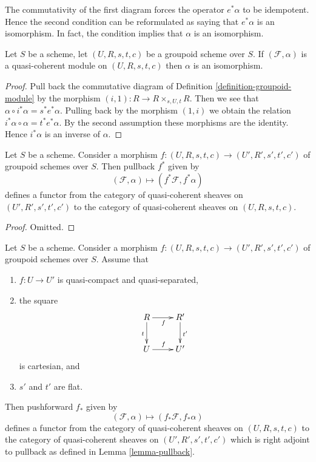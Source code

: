 \noindent
The commutativity of the first diagram forces the operator $e^*\alpha$
to be idempotent. Hence the second condition can be reformulated as saying
that $e^*\alpha$ is an isomorphism. In fact, the condition implies that
$\alpha$ is an isomorphism.

\begin{lemma}
\label{lemma-isomorphism}
Let $S$ be a scheme, let $(U, R, s, t, c)$ be a groupoid scheme over $S$.
If $(\mathcal{F}, \alpha)$ is a quasi-coherent module on $(U, R, s, t, c)$
then $\alpha$ is an isomorphism.
\end{lemma}

\begin{proof}
Pull back the commutative diagram of
Definition \ref{definition-groupoid-module}
by the morphism $(i, 1) : R \to R \times_{s, U, t} R$.
Then we see that $\alpha \circ i^*\alpha = s^*e^*\alpha$.
Pulling back by the morphism $(1, i)$ we obtain the relation
$i^*\alpha \circ \alpha = t^*e^*\alpha$. By the second assumption 
these morphisms are the identity. Hence $i^*\alpha$ is an inverse of
$\alpha$.
\end{proof}

\begin{lemma}
\label{lemma-pullback}
Let $S$ be a scheme. Consider a morphism
$f : (U, R, s, t, c) \to (U', R', s', t', c')$
of groupoid schemes over $S$. Then pullback $f^*$ given by
$$
(\mathcal{F}, \alpha) \mapsto (f^*\mathcal{F}, f^*\alpha)
$$
defines a functor from the category of quasi-coherent sheaves on
$(U', R', s', t', c')$ to the category of quasi-coherent sheaves on
$(U, R, s, t, c)$.
\end{lemma}

\begin{proof}
Omitted.
\end{proof}

\begin{lemma}
\label{lemma-pushforward}
Let $S$ be a scheme. Consider a morphism
$f : (U, R, s, t, c) \to (U', R', s', t', c')$
of groupoid schemes over $S$. Assume that
\begin{enumerate}
\item $f : U \to U'$ is quasi-compact and quasi-separated,
\item the square
$$
\xymatrix{
R \ar[d]_t \ar[r]_f & R' \ar[d]^{t'} \\
U \ar[r]^f & U'
}
$$
is cartesian, and
\item $s'$ and $t'$ are flat.
\end{enumerate}
Then pushforward $f_*$ given by
$$
(\mathcal{F}, \alpha) \mapsto (f_*\mathcal{F}, f_*\alpha)
$$
defines a functor from the category of quasi-coherent sheaves on
$(U, R, s, t, c)$ to the category of quasi-coherent sheaves on
$(U', R', s', t', c')$ which is right adjoint to pullback as defined in
Lemma \ref{lemma-pullback}.
\end{lemma}


